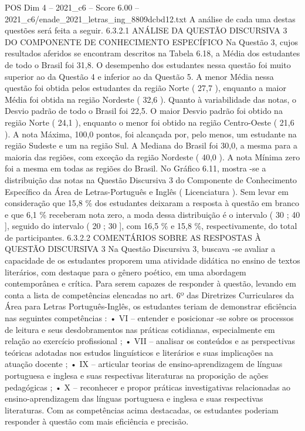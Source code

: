 \begin{textsample}{POS Dim 4 – 2021\_c6 – Score 6.00 – 2021\_c6/enade\_2021\_letras\_ing\_8809dcbd12.txt}
A análise de cada uma destas questões será feita a seguir. 6.3.2.1 ANÁLISE DA QUESTÃO DISCURSIVA 3 DO COMPONENTE DE CONHECIMENTO ESPECÍFICO Na Questão 3, cujos resultados aferidos se encontram descritos na Tabela 6.18, a Média dos estudantes de todo o Brasil foi 31,8.
O desempenho dos estudantes nessa questão foi muito superior ao da Questão 4 e inferior ao da Questão 5.
A menor Média nessa questão foi obtida pelos estudantes da região Norte ( 27,7 ), enquanto a maior Média foi obtida na região Nordeste ( 32,6 ).
Quanto à variabilidade das notas, o Desvio padrão de todo o Brasil foi 22,5.
O maior Desvio padrão foi obtido na região Norte ( 24,1 ), enquanto o menor foi obtido na região Centro-Oeste ( 21,6 ).
A nota Máxima, 100,0 pontos, foi alcançada por, pelo menos, um estudante na região Sudeste e um na região Sul.
A Mediana do Brasil foi 30,0, a mesma para a maioria das regiões, com exceção da região Nordeste ( 40,0 ).
A nota Mínima zero foi a mesma em todas as regiões do Brasil.
No Gráfico 6.11, mostra -se a distribuição das notas na Questão Discursiva 3 do Componente de Conhecimento Específico da Área de Letras-Português e Inglês ( Licenciatura ).
Sem levar em consideração que 15,8 \% dos estudantes deixaram a resposta à questão em branco e que 6,1 \% receberam nota zero, a moda dessa distribuição é o intervalo ( 30 ; 40 ], seguido do intervalo ( 20 ; 30 ], com 16,5 \% e 15,8 \%, respectivamente, do total de participantes. 6.3.2.2 COMENTÁRIOS SOBRE AS RESPOSTAS À QUESTÃO DISCURSIVA 3 Na Questão Discursiva 3, buscava -se avaliar a capacidade de os estudantes proporem uma atividade didática no ensino de textos literários, com destaque para o gênero poético, em uma abordagem contemporânea e crítica.
Para serem capazes de responder à questão, levando em conta a lista de competências elencadas no art. 6º das Diretrizes Curriculares da Área para Letras Português-Inglês, os estudantes teriam de demonstrar eficiência nas seguintes competências : • VI – entender e posicionar -se sobre os processos de leitura e seus desdobramentos nas práticas cotidianas, especialmente em relação ao exercício profissional ; • VII – analisar os conteúdos e as perspectivas teóricas adotadas nos estudos linguísticos e literários e suas implicações na atuação docente ; • IX – articular teorias de ensino-aprendizagem de línguas portuguesa e inglesa e suas respectivas literaturas na proposição de ações pedagógicas ; • X – reconhecer e propor práticas investigativas relacionadas ao ensino-aprendizagem das línguas portuguesa e inglesa e suas respectivas literaturas.
Com as competências acima destacadas, os estudantes poderiam responder à questão com mais eficiência e precisão.

\end{textsample}
